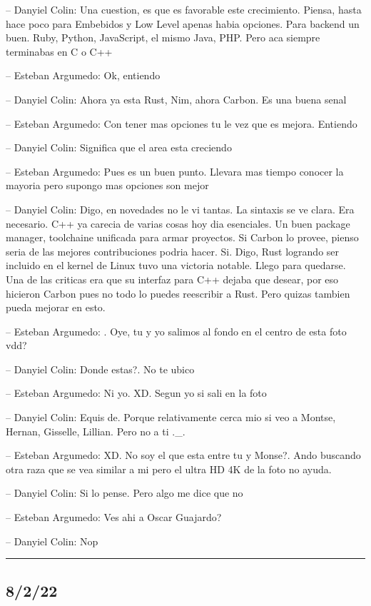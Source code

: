 -- Danyiel Colin: Una cuestion, es que es favorable este crecimiento.
Piensa, hasta hace poco para Embebidos y Low Level apenas habia
opciones. Para backend un buen. Ruby, Python, JavaScript, el mismo Java,
PHP. Pero aca siempre terminabas en C o C++

-- Esteban Argumedo: Ok, entiendo

-- Danyiel Colin: Ahora ya esta Rust, Nim, ahora Carbon. Es una buena
senal

-- Esteban Argumedo: Con tener mas opciones tu le vez que es mejora.
Entiendo

-- Danyiel Colin: Significa que el area esta creciendo

-- Esteban Argumedo: Pues es un buen punto. Llevara mas tiempo conocer
la mayoria pero supongo mas opciones son mejor

-- Danyiel Colin: Digo, en novedades no le vi tantas. La sintaxis se ve
clara. Era necesario. C++ ya carecia de varias cosas hoy dia esenciales.
Un buen package manager, toolchaine unificada para armar proyectos. Si
Carbon lo provee, pienso seria de las mejores contribuciones podria
hacer. Si. Digo, Rust logrando ser incluido en el kernel de Linux tuvo
una victoria notable. Llego para quedarse. Una de las criticas era que
su interfaz para C++ dejaba que desear, por eso hicieron Carbon pues no
todo lo puedes reescribir a Rust. Pero quizas tambien pueda mejorar en
esto.

-- Esteban Argumedo: . Oye, tu y yo salimos al fondo en el centro de
esta foto vdd?

-- Danyiel Colin: Donde estas?. No te ubico

-- Esteban Argumedo: Ni yo. XD. Segun yo si sali en la foto

-- Danyiel Colin: Equis de. Porque relativamente cerca mio si veo a
Montse, Hernan, Gisselle, Lillian. Pero no a ti .\_.

-- Esteban Argumedo: XD. No soy el que esta entre tu y Monse?. Ando
buscando otra raza que se vea similar a mi pero el ultra HD 4K de la
foto no ayuda.

-- Danyiel Colin: Si lo pense. Pero algo me dice que no

-- Esteban Argumedo: Ves ahi a Oscar Guajardo?

-- Danyiel Colin: Nop

\begin{center}\rule{0.5\linewidth}{0.5pt}\end{center}

\hypertarget{section-138}{%
\subsection{8/2/22}\label{section-138}}

